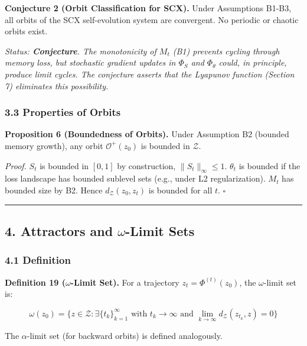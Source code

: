 \documentclass[
  12pt,
]{ctexart}
\begin{document}
\textbf{Conjecture 2 (Orbit Classification for SCX).} Under Assumptions
B1-B3, all orbits of the SCX self-evolution system are convergent. No
periodic or chaotic orbits exist.

\emph{Status: \textbf{Conjecture}. The monotonicity of \(M_t\) (B1)
prevents cycling through memory loss, but stochastic gradient updates in
\(\Phi_S\) and \(\Phi_\theta\) could, in principle, produce limit
cycles. The conjecture asserts that the Lyapunov function (Section 7)
eliminates this possibility.}

\subsubsection{3.3 Properties of Orbits}\label{properties-of-orbits}

\textbf{Proposition 6 (Boundedness of Orbits).} Under Assumption B2
(bounded memory growth), any orbit \(\mathcal{O}^+(z_0)\) is bounded in
\(\mathcal{Z}\).

\emph{Proof.} \(S_t\) is bounded in \([0,1]\) by construction,
\(\|S_t\|_\infty \leq 1\). \(\theta_t\) is bounded if the loss landscape
has bounded sublevel sets (e.g., under L2 regularization). \(M_t\) has
bounded size by B2. Hence \(d_{\mathcal{Z}}(z_0, z_t)\) is bounded for
all \(t\). \(\square\)

\begin{center}\rule{0.5\linewidth}{0.5pt}\end{center}

\subsection{\texorpdfstring{4. Attractors and \(\omega\)-Limit
Sets}{4. Attractors and \textbackslash omega-Limit Sets}}\label{attractors-and-omega-limit-sets}

\subsubsection{4.1 Definition}\label{definition-1}

\textbf{Definition 19 (\(\omega\)-Limit Set).} For a trajectory
\(z_t = \Phi^{(t)}(z_0)\), the \(\omega\)-limit set is:

\[\omega(z_0) = \bigl\{ z \in \mathcal{Z} : \exists \{t_k\}_{k=1}^\infty \text{ with } t_k \to \infty \text{ and } \lim_{k\to\infty} d_{\mathcal{Z}}(z_{t_k}, z) = 0 \bigr\}\]

The \(\alpha\)-limit set (for backward orbits) is defined analogously.
\end{document}
